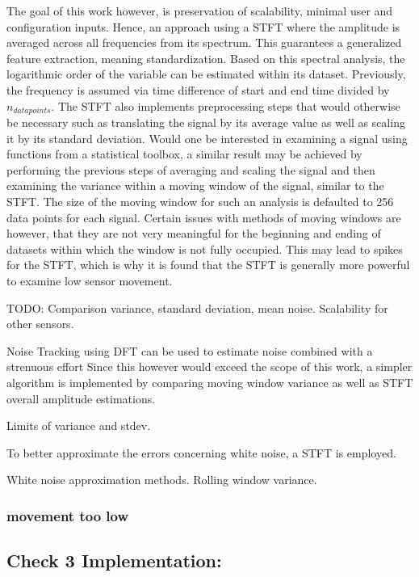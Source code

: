 The goal of this work however, is preservation of scalability, minimal user and configuration inputs. Hence, an approach using a STFT where the amplitude is averaged across all frequencies from its spectrum. This guarantees a generalized feature extraction, meaning standardization. Based on this spectral analysis, the logarithmic order of the variable can be estimated within its dataset. Previously, the frequency is assumed via time difference of start and end time divided by $n_{datapoints}$. The STFT also implements preprocessing steps that would otherwise be necessary such as translating the signal by its average value as well as scaling it by its standard deviation. Would one be interested in examining a signal using functions from a statistical toolbox, a similar result may be achieved by performing the previous steps of averaging and scaling the signal and then examining the variance within a moving window of the signal, similar to the STFT. The size of the moving window for such an analysis is defaulted to 256 data points for each signal. Certain issues with methods of moving windows are however, that they are not very meaningful for the beginning and ending of datasets within which the window is not fully occupied. This may lead to spikes for the STFT, which is why it is found that the STFT is generally more powerful to examine low sensor movement.

TODO: Comparison variance, standard deviation, mean noise. Scalability for other sensors.

Noise Tracking using DFT can be used to estimate noise combined with a strenuous effort
Since this however would exceed the scope of this work, a simpler algorithm is implemented by comparing moving window variance as well as STFT overall amplitude estimations.

Limits of variance and stdev.

To better approximate the errors concerning white noise, a STFT is employed.

White noise approximation methods. Rolling window variance.

\subsubsection{ movement too low}

\subsection{Check 3 Implementation: }

